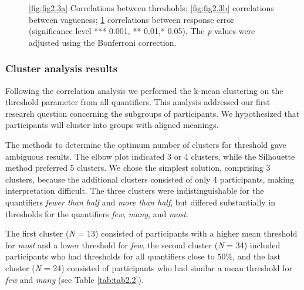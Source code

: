 \documentclass{article}
\begin{document}
\begin{figure} [H]
\begin{minipage}[t]{\textwidth}
\begin{minipage}[t]{0.49\textwidth}
\begin{subfigure}[t]{\linewidth}
     \caption{\label{fig:fig2.3c}}
    \end{subfigure}
    \end{minipage}
   \end{minipage}
    \caption{\ref{fig:fig2.3a} Correlations between thresholds; \ref{fig:fig2.3b} correlations between vagueness; \ref{fig:fig2.3c} correlations between response error (significance level *** 0.001, ** 0.01,*  0.05). The \textit{p} values were adjusted using the Bonferroni correction.}
    \label{fig:fig2.3}
\end{figure}
\fi

\subsubsection{Cluster analysis results}
Following the correlation analysis we performed the k-mean clustering on the threshold parameter from all quantifiers. This analysis addressed our first research question concerning the subgroups of participants. We hypothesized that participants will cluster into groups with aligned meanings.

The methods to determine the optimum number of clusters for threshold gave ambiguous results. The elbow plot indicated 3 or 4 clusters, while the Silhouette method preferred 5 clusters. We chose the simplest solution, comprising 3 clusters, because the additional clusters consisted of only 4 participants, making interpretation difficult. The three clusters were indistinguishable for the quantifiers \textit{fewer than half} and \textit{more than half}, but differed substantially in thresholds for the quantifiers \textit{few}, \textit{many}, and \textit{most}. %

The first cluster (\textit{N} = 13) consisted of participants with a higher mean threshold for \textit{most} and a lower threshold for \textit{few}, the second cluster (\textit{N} = 34) included participants who had thresholds for all quantifiers close to 50\%, and the last cluster (\textit{N} = 24) consisted of participants who had similar a mean threshold for \textit{few} and \textit{many} (see Table \ref{tab:tab2.2}). %
\end{document}
